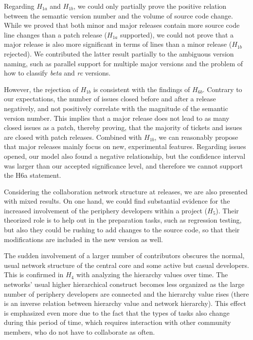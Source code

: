Regarding $H_{1a}$ and $H_{1b}$, we could only partially prove the positive relation between the semantic version number and the volume of source code change. While we proved that both minor and major releases contain more source code line changes than a patch release ($H_{1a}$ supported), we could not prove that a major release is also more significant in terms of lines than a minor release ($H_{1b}$ rejected). We contributed the latter result partially to the ambiguous version naming, such as parallel support for multiple major versions and the problem of how to classify \textit{beta} and \textit{rc} versions.

However, the rejection of $H_{1b}$ is consistent with the findings of $H_{6b}$. Contrary to our expectations, the number of issues closed before and after a release negatively, and not positively correlate with the magnitude of the semantic version number. This implies that a major release does not lead to as many closed issues as a patch, thereby proving, that the majority of tickets and issues are closed with patch releases. Combined with $H_{1b}$, we can reasonably propose that major releases mainly focus on new, experimental features. Regarding issues opened, our model also found a negative relationship, but the confidence interval was larger than our accepted significance level, and therefore we cannot support the H6a statement.

Considering the collaboration network structure at releases, we are also presented with mixed results. On one hand, we could find substantial evidence for the increased involvement of the periphery developers within a project ($H_5$). Their theorized role is to help out in the preparation tasks, such as regression testing, but also they could be rushing to add changes to the source code, so that their modifications are included in the new version as well.

The sudden involvement of a larger number of contributors obscures the normal, usual network structure of the central core and some active but casual developers. This is confirmed in $H_4$ with analyzing the hierarchy values over time. The networks' usual higher hierarchical construct becomes less organized as the large number of periphery developers are connected and the hierarchy value rises (there is an inverse relation between hierarchy value and network hierarchy). This effect is emphasized even more due to the fact that the types of tasks also change during this period of time, which requires interaction with other community members, who do not have to collaborate as often.

